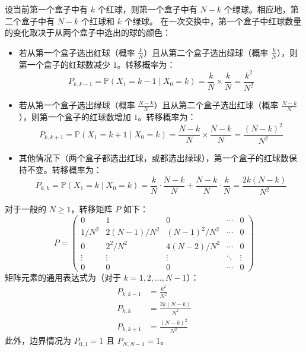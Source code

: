 \begin{questions}
\begin{solution}
    设当前第一个盒子中有 $k$ 个红球，则第一个盒子中有 $N - k$ 个绿球。相应地，第二个盒子中有 $N - k$ 个红球和 $k$ 个绿球。
    在一次交换中，第一个盒子中红球数量的变化取决于从两个盒子中选出的球的颜色：
    \begin{itemize}
        \item 若从第一个盒子选出红球（概率 $\frac{k}{N}$）且从第二个盒子选出绿球（概率 $\frac{k}{N}$），则第一个盒子的红球数减少 $1$。转移概率为：
        \[
        P_{k, k-1} = \mathbb{P}(X_1 = k - 1 \mid X_0 = k) = \frac{k}{N} \times \frac{k}{N} = \frac{k^2}{N^2}
        \]
        \item 若从第一个盒子选出绿球（概率 $\frac{N-k}{N}$）且从第二个盒子选出红球（概率 $\frac{N-k}{N}$），则第一个盒子的红球数增加 $1$。转移概率为：
        \[
        P_{k, k+1} = \mathbb{P}(X_1 = k + 1 \mid X_0 = k) = \frac{N - k}{N} \times \frac{N - k}{N} = \frac{(N - k)^2}{N^2}
        \]
        \item 其他情况下（两个盒子都选出红球，或都选出绿球），第一个盒子的红球数保持不变。转移概率为：
        \[
        P_{k, k} = \mathbb{P}(X_1 = k \mid X_0 = k) = \frac{k}{N} \cdot \frac{N - k}{N} + \frac{N - k}{N} \cdot \frac{k}{N} = \frac{2k(N - k)}{N^2}
        \]
    \end{itemize}
    对于一般的 $N \geqslant 1$，转移矩阵 $P$ 如下：
    \[
    P = \begin{pmatrix}
        0 & 1 & 0 & \cdots & 0 \\
        1/N^2 & 2(N-1)/N^2 & (N-1)^2/N^2 & \cdots & 0 \\
        0 & 2^2/N^2 & 4(N-2)/N^2 & \cdots & 0 \\
        \vdots & \vdots & \vdots & \ddots & \vdots \\
        0 & 0 & 0 & \cdots & 0
    \end{pmatrix}
    \]
    矩阵元素的通用表达式为（对于 $k = 1, 2, \dots, N-1$）：
    \begin{align*}
        P_{k, k-1} &= \frac{k^2}{N^2} \\
        P_{k, k} &= \frac{2k(N - k)}{N^2} \\
        P_{k, k+1} &= \frac{(N - k)^2}{N^2}
    \end{align*}
    此外，边界情况为 $P_{0, 1} = 1$ 且 $P_{N, N-1} = 1$。
\end{solution}

\question 
\begin{parts}

\end{parts}
\end{questions}
